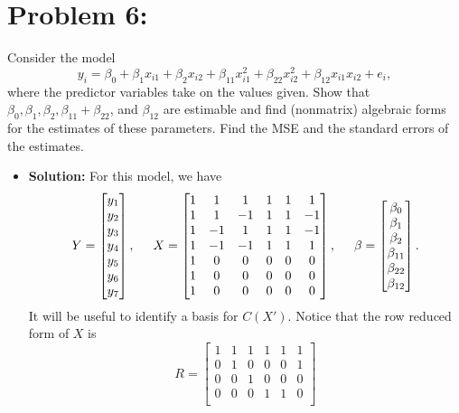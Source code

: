 \documentclass[11pt]{article}
\begin{document}
\section*{Problem 6:}
Consider the model
\[
y_i = \beta_0 + \beta_1x_{i1} + \beta_2x_{i2}+\beta_{11}x_{i1}^2 + \beta_{22}x_{i2}^2 + \beta_{12}x_{i1}x_{i2} + e_i,
\]
where the predictor variables take on the values given.  Show that $\beta_0,\beta_1,\beta_2,\beta_{11}+\beta_{22}$, and $\beta_{12}$ are estimable and find (nonmatrix) algebraic forms for the estimates of these parameters.  Find the MSE and the standard errors of the estimates.
\begin{itemize}
\item[] {\bf Solution:}  For this model, we have
\[
Y = \begin{bmatrix}
y_1 \\ y_2 \\ y_3 \\ y_4 \\ y_5 \\ y_6 \\ y_7
\end{bmatrix},\hspace{5mm} X = \begin{bmatrix}
1 & 1 & 1 & 1 & 1 & 1\\
1 & 1 & -1 & 1 & 1 & -1\\
1 & -1 & 1 & 1 & 1 & -1\\
1 & -1 & -1 & 1 & 1 & 1\\
1 & 0 & 0 & 0 & 0 & 0\\
1 & 0 & 0 & 0 & 0 & 0\\
1 & 0& 0 & 0 & 0 & 0\\
\end{bmatrix}, \hspace{5mm} \beta = \begin{bmatrix}
\beta_0 \\ \beta_1 \\ \beta_2 \\ \beta_{11} \\ \beta_{22} \\ \beta_{12}
\end{bmatrix}.
\]
It will be useful to identify a basis for $C(X')$. Notice that the row reduced form of $X$ is
\[R = 
\begin{bmatrix}
1 & 1 & 1 & 1 & 1 & 1 \\
0 & 1 & 0 & 0 & 0 & 1 \\
0 & 0 & 1 & 0 & 0 & 0 \\
0 & 0 & 0 & 1 & 1 & 0 \\

\end{bmatrix}\]
\end{itemize}
\end{document}

